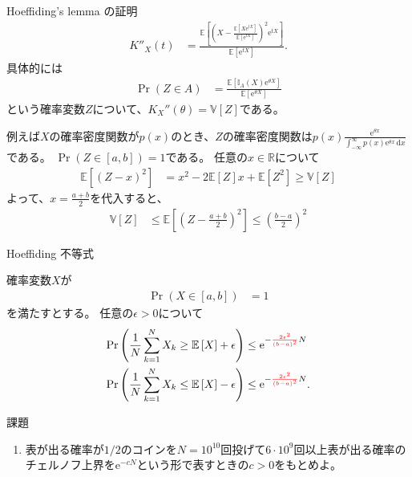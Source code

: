 \documentclass[lualatex,handout]{beamer}
\newcommand{\emm}[1]{\textcolor{red}{#1}}
\newcommand{\expt}[1]{\mathbb{E}\left[#1\right]}
\newcommand{\var}[1]{\mathbb{V}\left[#1\right]}
\newcommand\dx{{\,\mathrm{d}x}}
\theoremstyle{definition}
\begin{document}
\begin{frame}{Hoeffiding's lemma の証明}
\small
\begin{align*}
K''_X(t) 
&= \frac{\expt{\left(X-\frac{\expt{X\mathrm{e}^{tX}}}{\expt{\mathrm{e}^{tX}}}\right)^2\mathrm{e}^{tX}}}{\expt{\mathrm{e}^{tX}}}.
\end{align*}
具体的には
\begin{align*}
\Pr(Z\in A) &= \frac{\expt{\mathbb{I}_A(X)\mathrm{e}^{\theta X}}}{\expt{\mathrm{e}^{\theta X}}}
\end{align*}
という確率変数$Z$について、$K_X''(\theta) = \var{Z}$である。

例えば$X$の確率密度関数が$p(x)$のとき、$Z$の確率密度関数は$p(x)\frac{\mathrm{e}^{\theta x}}{\int_{-\infty}^\infty p(x)\mathrm{e}^{\theta x}\dx}$である。
$\Pr(Z\in[a,b])=1$である。
任意の$x\in\mathbb{R}$について
\begin{align*}
\expt{(Z-x)^2} &= x^2 - 2\expt{Z}x + \expt{Z^2}\ge \var{Z}
\end{align*}
よって、$x=\frac{a+b}2$を代入すると、
\begin{align*}
\var{Z} &\le \expt{\left(Z-\frac{a+b}2\right)^2}\le \left(\frac{b-a}2\right)^2
\end{align*}
\end{frame}

\begin{frame}{Hoeffiding 不等式}
\begin{theorem}
確率変数$X$が
\begin{align*}
\Pr(X\in[a,b])&=1
\end{align*}
を満たすとする。
任意の$\epsilon>0$について
\begin{align*}
\Pr\left(\frac1N\sum_{k=1}^N X_k \ge \expt{X} + \epsilon\right) &\le \mathrm{e}^{-\emm{\frac{2\epsilon^2}{(b-a)^2}}N}\\
\Pr\left(\frac1N\sum_{k=1}^N X_k \le \expt{X} - \epsilon\right) &\le \mathrm{e}^{-\emm{\frac{2\epsilon^2}{(b-a)^2}}N}.
\end{align*}
\end{theorem}
\end{frame}

\begin{frame}{課題}
\begin{enumerate}
\setlength{\itemsep}{2em}
\item 表が出る確率が$1/2$のコインを$N=10^{10}$回投げて$6\cdot 10^9$回以上表が出る確率のチェルノフ上界を$\mathrm{e}^{-cN}$という形で表すときの$c>0$をもとめよ。
\end{enumerate}
\end{frame}

\end{document}
